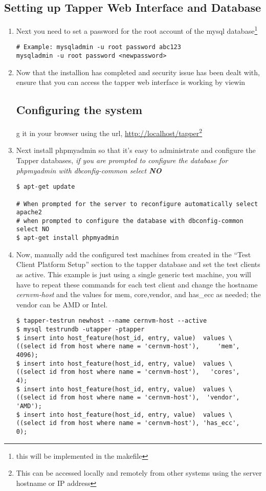 \subsection{Setting up Tapper Web Interface and Database}
\begin{enumerate}
\item Next you need to set a password for the root account of the mysql database\footnote{this will be implemented in the makefile}
\lstset{caption= Set MySQL Root Password}
\begin{lstlisting}
# Example: mysqladmin -u root password abc123
mysqladmin -u root password <newpassword>
\end{lstlisting}

\item Now that the installion has completed and security issue has been dealt with, ensure that you can access the tapper web
interface is working by viewin\subsection{Configuring the system}g it in your browser using the url,  
\url{http://localhost/tapper}\footnote{This can be accessed locally and remotely from other systems using the server hostname or IP address}

\item Next install phpmyadmin so that it's easy to administrate and configure the Tapper databases, \emph{if you are prompted to 
configure the database for phpmyadmin with dbconfig-common select {\bf NO} } 
\lstset{caption= Install PHPMyAdmin}
\begin{lstlisting}
$ apt-get update

# When prompted for the server to reconfigure automatically select apache2
# when prompted to configure the database with dbconfig-common select NO
$ apt-get install phpmyadmin
\end{lstlisting}

\item Now, manually add the configured test machines from created in the ``Test Client Platform Setup'' section to the
tapper database and set the test clients as active. This example is just using a single generic test machine, you will
have to repeat these commands for each test client and change the hostname \emph{cernvm-host} and the values for mem,
core,vendor, and has\_ecc as needed; the vendor can be AMD or Intel.
\lstset{caption= Adding Test Clients to Tapper Database}
\begin{lstlisting}
$ tapper-testrun newhost --name cernvm-host --active
$ mysql testrundb -utapper -ptapper
$ insert into host_feature(host_id, entry, value)  values \
((select id from host where name = 'cernvm-host'),     'mem',  4096);
$ insert into host_feature(host_id, entry, value)  values \
((select id from host where name = 'cernvm-host'),   'cores',     4);
$ insert into host_feature(host_id, entry, value)  values \
((select id from host where name = 'cernvm-host'),  'vendor', 'AMD');
$ insert into host_feature(host_id, entry, value)  values \
((select id from host where name = 'cernvm-host'), 'has_ecc',     0);
\end{lstlisting}



\end{enumerate}
